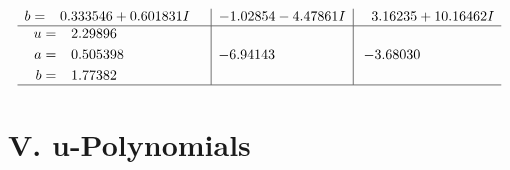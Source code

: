 \documentclass[1p]{elsarticle_modified}
\theoremstyle{definition}
\begin{document}
$$\begin{array}{c|c|c}
\begin{aligned}
b &= \phantom{-}0.333546 + 0.601831 I\end{aligned}
 & -1.02854 - 4.47861 I & \phantom{-}3.16235 + 10.16462 I \\ \hline\begin{aligned}
u &= \phantom{-}2.29896\phantom{ +0.000000I} \\
a &= \phantom{-}0.505398\phantom{ +0.000000I} \\
b &= \phantom{-}1.77382\phantom{ +0.000000I}\end{aligned}
 & -6.94143\phantom{ +0.000000I} & -3.68030\phantom{ +0.000000I}\\
 \hline 
 \end{array}$$\newpage
\newpage\renewcommand{\arraystretch}{1}
\centering \section*{ V. u-Polynomials}
\end{document}
